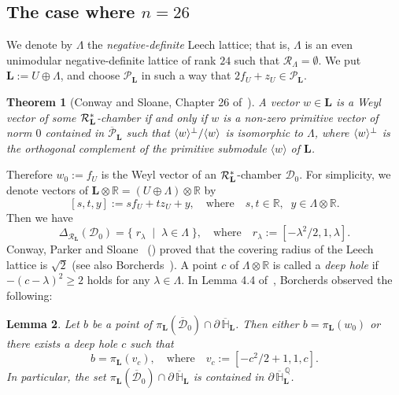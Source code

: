 \documentclass{amsart}
\theoremstyle{plain}
\newtheorem{theorem}{Theorem}[section]
\newtheorem{lemma}[theorem]{Lemma}
\theoremstyle{definition}
\theoremstyle{remark}
\numberwithin{equation}{section}
\numberwithin{table}{section}
\numberwithin{figure}{section}
\renewcommand{\H}{\mathord{\mathbb H}}
\newcommand{\Q}{\mathord{\mathbb  Q}}
\newcommand{\R}{\mathord{\mathbb R}}
\newcommand{\DDD}{\mathord{\mathcal D}}
\newcommand{\PPP}{\mathord{\mathcal P}}
\newcommand{\RRR}{\mathord{\mathcal R}}
\newcommand{\set}[2]{\{\; {#1} \; \mid \; {#2} \;  \}}
\newcommand{\gen}[1]{\langle {#1}  \rangle}
\newcommand{\tensor}{\otimes}
\newcommand{\sperp}{\sp{\perp}}
\newcommand{\bdr}{\partial\,}
\newcommand{\closure}[1]{\overline{#1}}
\renewcommand{\L}{\mathord{\mathbf{L}}}
\newcommand{\Roots}{\RRR}
\newcommand{\sphyp}{\sp*}
\newcommand{\clPPP}{\overline{\PPP}}
\newcommand{\clH}{\overline{\H}}
\newcommand{\bdrclH}{\bdr\clH}
\newcommand{\bdrclHQ}{\bdr\clH^{\,\Q}}
\begin{document}
\subsection{The case where  $n=26$}
%
%
%
We denote by $\Lambda$ the \emph{negative-definite} Leech lattice;
that is,  $\Lambda$ is an even unimodular negative-definite lattice of rank $24$ such that
$\Roots_{\Lambda}=\emptyset$.
We put $\L:=U\oplus \Lambda$, 
and  choose $\PPP_{\L}$ in such a way that  $2f_U+z_U\in \PPP_{\L}$.
%
\begin{theorem}[Conway and Sloane, Chapter 26 of~\cite{MR1662447}]\label{thm:ConwaySloane}
A vector $w\in \L$ is a Weyl vector 
of some $\Roots_{\L}\sphyp$-chamber
if and only if
$w$ is a non-zero primitive vector of norm $0$
contained in $\clPPP_{\L}$ such that 
$\gen{w}\sperp/\gen{w}$ is isomorphic to $\Lambda$,
where $\gen{w}\sperp$ is the orthogonal complement of the primitive submodule $\gen{w}$ of $\L$.
\end{theorem}
%
Therefore
$w_0:=f_U$
is the Weyl vector of an $\Roots_{\L}\sphyp$-chamber 
$\DDD_0$.
For simplicity, we denote vectors of $\L\tensor\R=(U\oplus\Lambda)\tensor\R$ by 
$$
[s, t, y]:=s f_U +t z_U +y, \quad\textrm{where}\quad s, t\in \R,\;\; y\in \Lambda\tensor\R.
$$
Then we have
$$
\Delta_{\Roots_{\L}}(\DDD_0)=\set{r_{\lambda}}{\lambda\in \Lambda},
\quad\textrm{where}\quad
r_{\lambda}:=\left[-\lambda^2/2, 1, \lambda\right].
$$
%
%
Conway, Parker and Sloane~\cite{MR660415} (\cite[Chapter 23]{MR1662447})
proved that the covering radius of the Leech lattice is $\sqrt{2}$
(see also Borcherds~\cite{MR791880}).
A point $c$ of  $\Lambda\tensor\R$ is called a \emph{deep hole}
if $-(c-\lambda)^2\ge 2$ holds for  any  $\lambda\in \Lambda$.
In Lemma 4.4 of~\cite{MR913200},
Borcherds observed the following:
%
\begin{lemma}\label{lem:property_d_L_26}
Let $b$ be a point of $\pi_{\L} (\closure{\DDD}_0)\cap\bdrclH_{\L}$.
Then either $b=\pi_{\L}(w_0)$ or there exists a deep hole
$c$ such that
$$
b=\pi_{\L}(v_c), \quad\textrm{where}\quad
v_c:=\left[-{c^2}/{2}+1, 1, c\right].
$$
In particular,
the set $\pi_{\L} (\closure{\DDD}_0)\cap\bdrclH_{\L}$
is contained in $\bdrclHQ_{\L}$.
\end{lemma}
%
\end{document}
